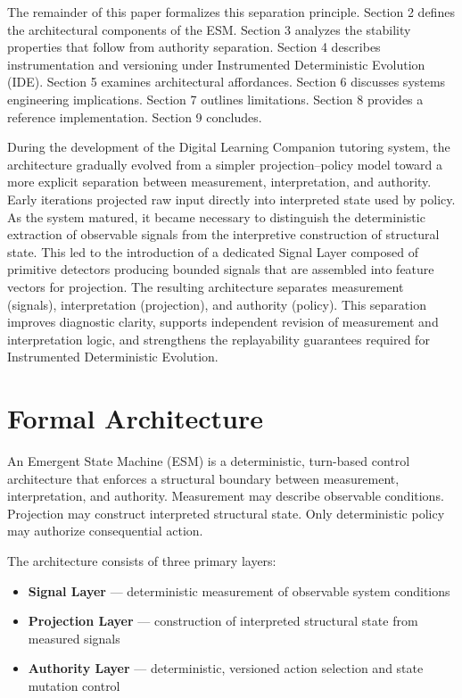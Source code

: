 \documentclass[11pt]{article}
\begin{document}
The remainder of this paper formalizes this separation principle. Section 2 defines the architectural components of the ESM. Section 3 analyzes the stability properties that follow from authority separation. Section 4 describes instrumentation and versioning under Instrumented Deterministic Evolution (IDE). Section 5 examines architectural affordances. Section 6 discusses systems engineering implications. Section 7 outlines limitations. Section 8 provides a reference implementation. Section 9 concludes.

During the development of the Digital Learning Companion tutoring system, the architecture gradually evolved from a simpler projection–policy model toward a more explicit separation between measurement, interpretation, and authority. Early iterations projected raw input directly into interpreted state used by policy. As the system matured, it became necessary to distinguish the deterministic extraction of observable signals from the interpretive construction of structural state. This led to the introduction of a dedicated Signal Layer composed of primitive detectors producing bounded signals that are assembled into feature vectors for projection. The resulting architecture separates measurement (signals), interpretation (projection), and authority (policy). This separation improves diagnostic clarity, supports independent revision of measurement and interpretation logic, and strengthens the replayability guarantees required for Instrumented Deterministic Evolution.


\section{Formal Architecture}

An Emergent State Machine (ESM) is a deterministic, turn-based control architecture that enforces a structural boundary between measurement, interpretation, and authority. Measurement may describe observable conditions. Projection may construct interpreted structural state. Only deterministic policy may authorize consequential action.

The architecture consists of three primary layers:

\begin{itemize}
  \item \textbf{Signal Layer} — deterministic measurement of observable system conditions
  \item \textbf{Projection Layer} — construction of interpreted structural state from measured signals
  \item \textbf{Authority Layer} — deterministic, versioned action selection and state mutation control
\end{itemize}
\end{document}

